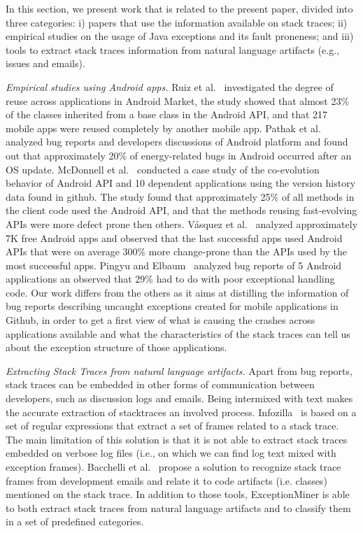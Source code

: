 \documentclass[conference]{IEEEtran}
\begin{document}
In this section, we present work that is related to the present paper, divided into
three categories: i) papers that use the information available on stack traces;
ii) empirical studies on the usage of Java exceptions and its fault proneness;
and iii) tools to extract stack traces information from natural language artifacts
(e.g., issues and emails).


\textit{Empirical studies using Android apps.} Ruiz et al.~\cite{Ruiz12}
investigated the degree of reuse across applications in Android Market, the
study showed that almost 23\% of the classes inherited from a base class in the
Android API, and that 217 mobile apps were reused completely by another mobile
app. Pathak et al.~\cite{Patha11} analyzed bug reports and developers
discussions of Android platform and found out that approximately 20\% of
energy-related bugs in Android occurred after an OS update. McDonnell et
al.~\cite{McDon13} conducted a case study of the co-evolution behavior of
Android API and 10 dependent applications using the version history data found
in github. The study found that approximately 25\% of all methods in the client
code used the Android API, and that the methods reusing fast-evolving APIs were
more defect prone then others. Vásquez et al.~\cite{Linar13} analyzed
approximately 7K free Android apps and observed that the last successful apps
used Android APIs that were on average 300\% more change-prone than the APIs
used by the most successful apps. Pingyu and Elbaum~\cite{Zhang12} analyzed bug
reports of 5 Android applications an observed that 29\% had to do with poor
exceptional handling code. Our work differs from the others as it aims at
distilling the information of bug reports describing uncaught exceptions created
for mobile applications in Github, in order to get a first view
of what is causing the crashes across applications available and what the
characteristics of the stack traces can tell us about the exception structure of
those applications.

\textit{Extracting Stack Traces from natural language artifacts.} 
Apart from bug reports, stack traces can be embedded in other forms of
communication between developers, such as discussion logs and emails.
Being intermixed with text makes the accurate extraction of stacktraces 
an involved process.
Infozilla~\cite{bettenburg2008extracting}
is based on a set of regular expressions that extract a set of frames
related to a stack trace. The main limitation of this solution is that it is not
able to extract stack traces embedded on verbose log files (i.e., on which we
can find log text mixed with exception frames). Bacchelli
et al.~\cite{bacchelli2012content} propose a solution to recognize stack trace frames
from development emails and relate it to code artifacts (i.e. classes) mentioned
on the stack trace. In addition to those tools, ExceptionMiner is able to 
both extract stack traces from natural language artifacts and to 
classify them in a set of predefined categories.
\end{document}
